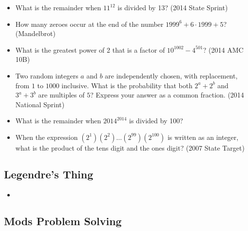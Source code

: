 \documentclass{article}
\begin{document}
\begin{itemize}

\item What is the remainder when $11^{12}$ is divided by 13? (2014 State Sprint)

\item How many zeroes occur at the end of the number $1999^6+6\cdot 1999+5$? (Mandelbrot)

\item What is the greatest power of 2 that is a factor of $10^{1002}-4^{501}$? (2014 AMC 10B)

\item Two random integers $a$ and $b$ are independently chosen, with replacement, from $1$ to $1000$ inclusive. What is the probability that both $2^a+2^b$ and $3^a+3^b$ are multiples of $5$? Express your answer as a common fraction. (2014 National Sprint)

\item What is the remainder when $2014^{2014}$ is divided by 100?

\item When the expression $(2^1)(2^2)\ldots (2^{99})(2^{100})$ is written as an integer, what is the product of the tens digit and the ones digit? (2007 State Target)
\end{itemize}


\subsection{Legendre's Thing}

\begin{itemize}

\item 


\end{itemize}

\subsection{Mods Problem Solving}
\end{document}

